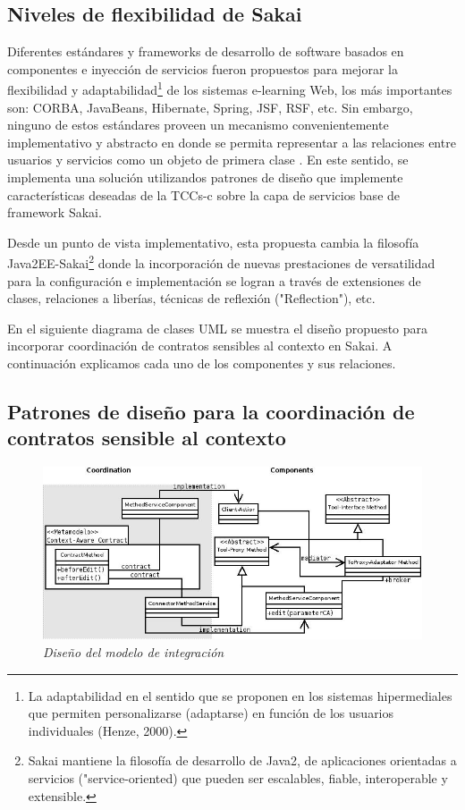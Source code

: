 \subsection {Niveles de flexibilidad de Sakai}

Diferentes estándares y frameworks de desarrollo de software basados en componentes e inyección de servicios fueron propuestos para mejorar la flexibilidad y adaptabilidad\footnote {La adaptabilidad en el sentido que se proponen en los sistemas hipermediales que permiten personalizarse (adaptarse) en función de los usuarios individuales (Henze, 2000).} de los sistemas e-learning Web, los más importantes son: CORBA, JavaBeans, Hibernate, Spring, JSF, RSF, etc. Sin embargo, ninguno de estos estándares proveen un mecanismo convenientemente implementativo y abstracto en donde se 
permita representar a las relaciones entre usuarios y servicios como un objeto de primera clase \cite{Meyer}. En este sentido, se implementa una solución utilizandos patrones de diseño que implemente características deseadas de la TCCs-c sobre la capa de servicios base de framework Sakai.

Desde un punto de vista implementativo, esta propuesta cambia la filosofía Java2EE-Sakai\footnote{Sakai mantiene la filosofía de desarrollo de Java2, de aplicaciones orientadas a servicios ("service-oriented) que pueden ser escalables, fiable, interoperable y extensible.} donde la incorporación de nuevas prestaciones de versatilidad para la configuración e implementación se logran a través de extensiones de clases, relaciones a liberías, técnicas de reflexión ("Reflection"), etc. 

En el siguiente diagrama de clases UML se muestra el diseño propuesto para incorporar coordinación de contratos sensibles al contexto en Sakai. A continuación explicamos  cada uno de los componentes y sus relaciones.


\subsection {Patrones de diseño para la coordinación de contratos sensible al contexto}

\begin{figure}[!ht]
\begin{center}
	\includegraphics[width=5 in,totalheight=2.4 in]{Ch5/f4}
	\caption{\small \sl Diseño del modelo de integración} \label{contratos-patrones}
\end{center}
         \end{figure}

